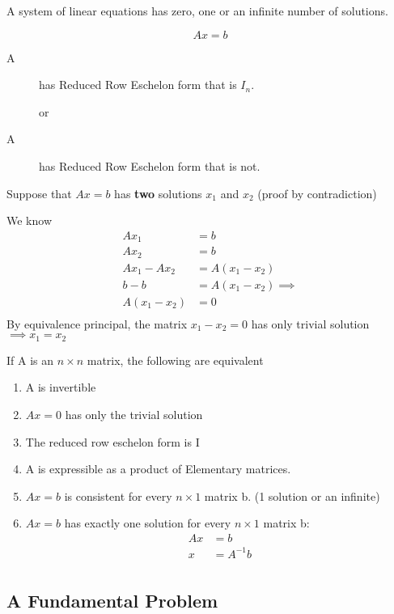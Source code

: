 \begin{theorem}[1.6.1]
	A system of linear equations has zero, one or an infinite number of solutions.

	\[Ax = b\]
	\begin{description}
		\item[A] has Reduced Row Eschelon form that is $I_{n}$.

			or

		\item[A] has Reduced Row Eschelon form that is not.

	\end{description}
	Suppose that $Ax = b$ has \textbf{two} solutions $x_1$ and $x_2$ (proof by contradiction)

	We know
	\begin{align*}
		Ax_1 &= b \\
		Ax_2 &= b \\
		Ax_1 - Ax_2 &=  A(x_1-x_2) \\
		b - b &= A (x_1 - x_2) \implies \\
		A(x_1-x_2) &= 0 \\
	\end{align*}
	By equivalence principal, the matrix $x_1-x_2=0$ has only trivial solution $\implies \boxed{x_1 = x_2}$


\end{theorem}

If A is an $n \times n$ matrix, the following are equivalent
\begin{enumerate}
	\item A is invertible
	\item $Ax = 0$ has only the trivial solution
	\item The reduced row eschelon form is I
	\item A is expressible as a product of Elementary matrices.
	\item $Ax=b$ is consistent for every $n\times 1$ matrix b. (1 solution or an infinite)
	\item $Ax = b$ has exactly one solution for every $n\times 1$ matrix b:
		\begin{align*}
			Ax &= b \\
			x &= \boxed{A^{-1}b} \\
		\end{align*}
\end{enumerate}


\subsection{A Fundamental Problem}%
\label{sub:a_fundamental_problem}

